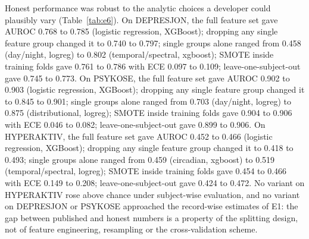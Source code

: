 Honest performance was robust to the analytic choices a developer could plausibly vary (Table~\ref{tab:e6}). On DEPRESJON, the full feature set gave AUROC 0.768 to 0.785 (logistic regression, XGBoost); dropping any single feature group changed it to 0.740 to 0.797; single groups alone ranged from 0.458 (day/night, logreg) to 0.802 (temporal/spectral, xgboost); SMOTE inside training folds gave 0.761 to 0.786 with ECE 0.097 to 0.109; leave-one-subject-out gave 0.745 to 0.773. On PSYKOSE, the full feature set gave AUROC 0.902 to 0.903 (logistic regression, XGBoost); dropping any single feature group changed it to 0.845 to 0.901; single groups alone ranged from 0.703 (day/night, logreg) to 0.875 (distributional, logreg); SMOTE inside training folds gave 0.904 to 0.906 with ECE 0.046 to 0.082; leave-one-subject-out gave 0.899 to 0.906. On HYPERAKTIV, the full feature set gave AUROC 0.452 to 0.466 (logistic regression, XGBoost); dropping any single feature group changed it to 0.418 to 0.493; single groups alone ranged from 0.459 (circadian, xgboost) to 0.519 (temporal/spectral, logreg); SMOTE inside training folds gave 0.454 to 0.466 with ECE 0.149 to 0.208; leave-one-subject-out gave 0.424 to 0.472. No variant on HYPERAKTIV rose above chance under subject-wise evaluation, and no variant on DEPRESJON or PSYKOSE approached the record-wise estimates of E1: the gap between published and honest numbers is a property of the splitting design, not of feature engineering, resampling or the cross-validation scheme.
